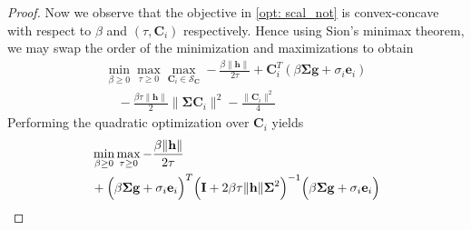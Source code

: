 \documentclass[conference]{IEEEtran}
\newcommand{\bC}{\mathbf{C}}
\newcommand{\calS}{\mathcal{S}}
\begin{document}
\begin{proof}
Now we observe that the objective in \eqref{opt: scal_not} is convex-concave with respect to $\beta$ and $(\tau, \bC_i)$ respectively. Hence using Sion's minimax theorem, we may swap the order of the minimization and maximizations to obtain
\begin{align*}
    \min_{\beta \ge 0} \max_{\tau \ge 0} \max_{\mathbf{C}_i \in \calS_{\bC}}  - \frac{\beta\|\mathbf{h}\|}{2\tau} + \mathbf{C}_i^T \left(\beta \boldsymbol{\Sigma} \mathbf{g} + \sigma_i\mathbf{e}_i\right) \\
    \quad - \frac{\beta\tau  \|\mathbf{h}\|}{2} \|\boldsymbol{\Sigma}\mathbf{C}_i\|^2 - \frac{\|\mathbf{C}_i\|^2}{4}
\end{align*}
Performing the quadratic optimization over $\bC_i$ yields
\begin{align}\label{eq: obj_before_HW}
& \min_{\beta \ge 0} \max_{\tau \ge 0}  - \frac{\beta\|\mathbf{h}\|}{2\tau} \nonumber \\ 
& + \Bigl(\beta \boldsymbol{\Sigma} \mathbf{g} + \sigma_i\mathbf{e}_i\Bigr)^T\Bigl(\mathbf{I} + 2 \beta\tau \|\mathbf{h}\|\boldsymbol{\Sigma}^2\Bigr)^{-1} \Bigl(\beta \boldsymbol{\Sigma} \mathbf{g} + \sigma_i\mathbf{e}_i\Bigr) 
\end{align}




\end{proof}
\end{document}
